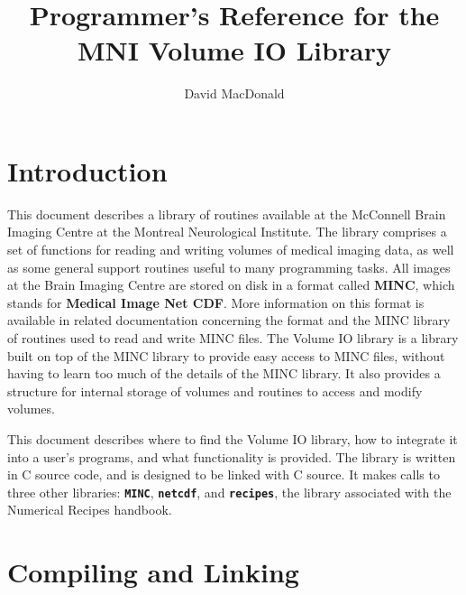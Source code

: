 
\title{Programmer's Reference for the MNI Volume IO Library}
\author{David MacDonald}

\newcommand{\path}{{\bf\tt /nil/david/Release/MNI\_lib}}
\newcommand{\name}[1]{{\bf\tt #1}}

\newcommand{\desc}[1]{\begin{tabular}{p{2cm}p{10cm}}
& #1 \end{tabular}}



\maketitle

\newpage

\tableofcontents

\newpage

\chapter{Introduction}

This document describes a library of routines available at the
McConnell Brain Imaging Centre at the Montreal Neurological Institute.
The library comprises a set of functions for reading and writing
volumes of medical imaging data, as well as some general support
routines useful to many programming tasks.  All images at the Brain
Imaging Centre are stored on disk in a format called {\bf MINC}, which
stands for {\bf Medical Image Net CDF}.  More information on this
format is available in related documentation concerning the format and
the MINC library of routines used to read and write MINC files.  The
Volume IO library is a library built on top of the MINC library to
provide easy access to MINC files, without having to learn too much of
the details of the MINC library.  It also provides a structure for internal
storage of volumes and routines to access and modify volumes.

This document describes where to find the Volume IO library, how to
integrate it into a user's programs, and what functionality
is provided.  The library is written in C source code, and is designed
to be linked with C source.  It makes calls to three other libraries:
\name{MINC}, \name{netcdf}, and \name{recipes}, the library associated
with the Numerical Recipes handbook.

\chapter{Compiling and Linking}

